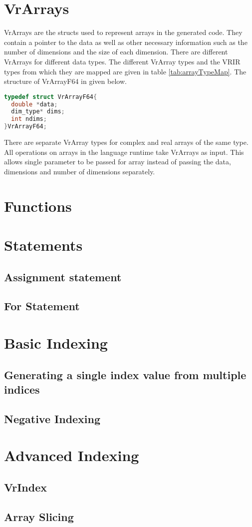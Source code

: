 \section{VrArrays}
\label{sec:vrarray}
VrArrays are the structs used to represent arrays in the generated code. They contain a pointer to the data as well as other necessary information such as the number of dimensions and the size of each dimension. There are different VrArrays for different data types. The different VrArray types and the VRIR types from which they are mapped are given in table \ref{tab:arrayTypeMap}. The structure of VrArrayF64 in given below. 
\begin{lstlisting}[language=c]
typedef struct VrArrayF64{
  double *data;
  dim_type* dims;  
  int ndims;
}VrArrayF64;
\end{lstlisting}
There are separate VrArray types for complex and real arrays of the same type. All operations on arrays in the language runtime take VrArrays as input. This allows  single parameter to be passed for array instead of passing the data, dimensions and number of dimensions separately.
\section{Functions} 
\section{Statements}
\subsection{Assignment statement}
\subsection{For Statement}
\section{Basic Indexing}
\subsection{ Generating a single index value from multiple indices}
\subsection{Negative Indexing}
\section{Advanced Indexing}
\subsection{VrIndex}
\subsection{Array Slicing}
